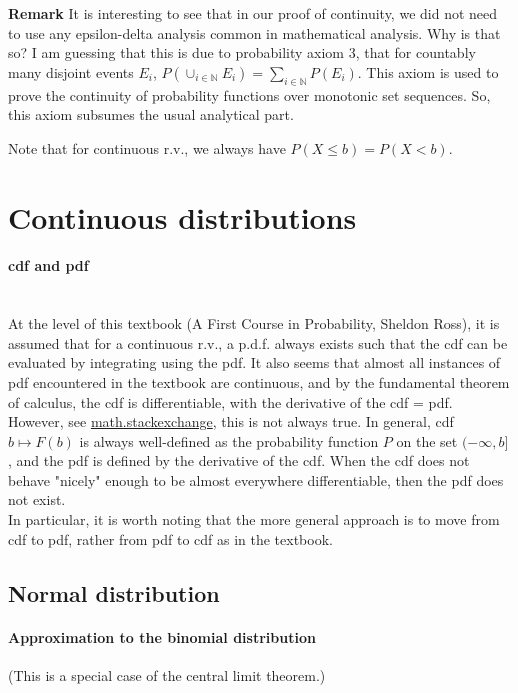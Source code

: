 \documentclass{article}
\begin{document}
\textbf{Remark} It is interesting to see that in our proof of continuity, we did not need to use any epsilon-delta analysis common in mathematical analysis. Why is that so? I am guessing that this is due to probability axiom 3, that for countably many disjoint events $E_i$, $P(\cup_{i\in \mathbb{N}} E_i) = \sum_{i\in \mathbb{N}}P(E_i)$. This axiom is used to prove the continuity of probability functions over monotonic set sequences. So, this axiom subsumes the usual analytical part.

Note that for continuous r.v., we always have $P(X\leq b) = P(X < b)$.

\section{Continuous distributions}
\paragraph{cdf and pdf}\mbox{}\\
At the level of this textbook (A First Course in Probability, Sheldon Ross), it is assumed that for a continuous r.v., a p.d.f. always exists such that the cdf can be evaluated by integrating using the pdf. It also seems that almost all instances of pdf encountered in the textbook are continuous, and by the fundamental theorem of calculus, the cdf is differentiable, with the derivative of the cdf = pdf.\\
However, see \href{math.stackexchange.com/questions/3379661/does-a-random-variable-always-have-a-cumulative-distribution-function/3379708}{math.stackexchange}, this is not always true. In general, cdf $b\mapsto F(b)$ is always well-defined as the probability function $P$ on the set $(-\infty, b]$, and the pdf is defined by the derivative of the cdf. When the cdf does not behave "nicely" enough to be almost everywhere differentiable, then the pdf does not exist.\\
In particular, it is worth noting that the more general approach is to move from cdf to pdf, rather from pdf to cdf as in the textbook.



\subsection{Normal distribution}
\paragraph{Approximation to the binomial distribution} (This is a special case of the central limit theorem.)
\end{document}
